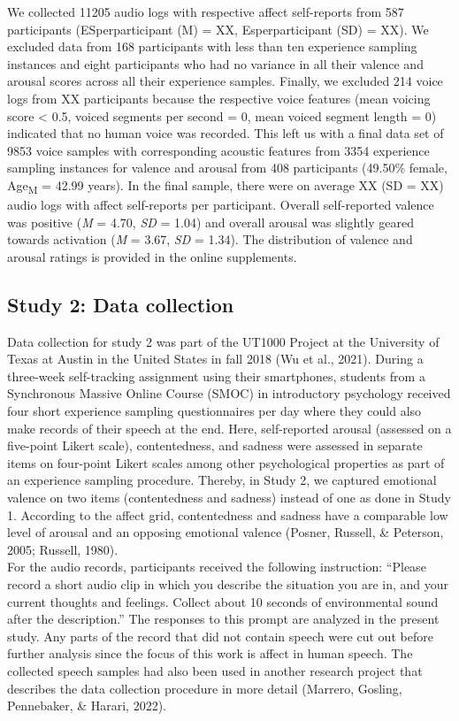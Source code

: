 \documentclass[
  english,
  man,floatsintext]{apa6}
\begin{document}
We collected 11205 audio logs with respective affect self-reports from 587 participants (ESperparticipant (M) = XX, Esperparticipant (SD) = XX). We excluded data from 168 participants with less than ten experience sampling instances and eight participants who had no variance in all their valence and arousal scores across all their experience samples. Finally, we excluded 214 voice logs from XX participants because the respective voice features (mean voicing score \textless{} 0.5, voiced segments per second = 0, mean voiced segment length = 0) indicated that no human voice was recorded.
This left us with a final data set of 9853 voice samples with corresponding acoustic features from 3354 experience sampling instances for valence and arousal from 408 participants (49.50\% female, Age\textsubscript{M} = 42.99 years). In the final sample, there were on average XX (SD = XX) audio logs with affect self-reports per participant. Overall self-reported valence was positive (\emph{M} = 4.70, \emph{SD} = 1.04) and overall arousal was slightly geared towards activation (\emph{M} = 3.67, \emph{SD} = 1.34). The distribution of valence and arousal ratings is provided in the online supplements.

\hypertarget{study-2-data-collection}{%
\subsection{Study 2: Data collection}\label{study-2-data-collection}}

Data collection for study 2 was part of the UT1000 Project at the University of Texas at Austin in the United States in fall 2018 (Wu et al., 2021). During a three-week self-tracking assignment using their smartphones, students from a Synchronous Massive Online Course (SMOC) in introductory psychology received four short experience sampling questionnaires per day where they could also make records of their speech at the end. Here, self-reported arousal (assessed on a five-point Likert scale), contentedness, and sadness were assessed in separate items on four-point Likert scales among other psychological properties as part of an experience sampling procedure. Thereby, in Study 2, we captured emotional valence on two items (contentedness and sadness) instead of one as done in Study 1. According to the affect grid, contentedness and sadness have a comparable low level of arousal and an opposing emotional valence (Posner, Russell, \& Peterson, 2005; Russell, 1980).\\
For the audio records, participants received the following instruction: ``Please record a short audio clip in which you describe the situation you are in, and your current thoughts and feelings. Collect about 10 seconds of environmental sound after the description.'' The responses to this prompt are analyzed in the present study. Any parts of the record that did not contain speech were cut out before further analysis since the focus of this work is affect in human speech. The collected speech samples had also been used in another research project that describes the data collection procedure in more detail (Marrero, Gosling, Pennebaker, \& Harari, 2022).
\end{document}
